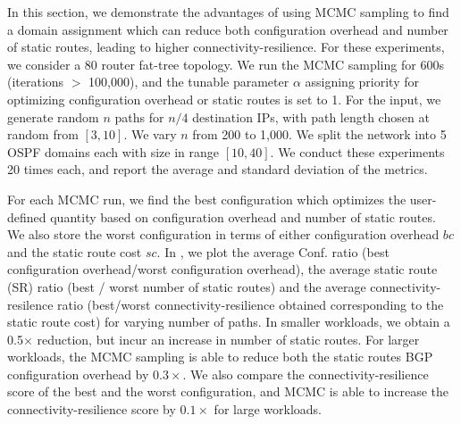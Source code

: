 In this section, we demonstrate the advantages of using MCMC sampling
to find a domain assignment which can  
reduce both configuration overhead and number of static routes, 
leading to higher connectivity-resilience. 
For these experiments,
we consider a
80 router fat-tree topology. 
We run the MCMC sampling for 600s
(iterations $>$ 100,000), 
and the tunable parameter $\alpha$ assigning
priority for optimizing configuration 
overhead or static routes is set
to 1. For the input, we generate 
random $n$ paths for $n/4$
destination IPs, with path
 length chosen at random from $[3,10]$. 
We vary $n$ from 200 to 1,000.
We
split the network into 5 OSPF domains 
each with size in range $[10,40]$. We
conduct these experiments 20 times each, 
and report the average and
standard deviation of the metrics.

%
For each MCMC run, we find the best configuration
which optimizes the user-defined quantity based on 
configuration overhead and number of static routes. 
We also store the worst configuration in terms of either
configuration overhead $bc$ and the static route cost 
$sc$. In , we plot the average Conf. ratio 
(best configuration overhead/worst configuration overhead), 
the average static route (SR) ratio 
(best / worst number of static routes) and the average 
connectivity-resilence ratio (best/worst connectivity-resilience obtained corresponding to the 
static route cost)
for varying number of paths. 
In smaller workloads, we obtain a 0.5$\times$ reduction, 
but incur an increase in number of static routes. For 
larger workloads, the MCMC sampling is able to
reduce both the static routes 
BGP configuration overhead by $0.3\times$. We also
compare the connectivity-resilience score 
of the best and the worst configuration, and MCMC
is able to increase the connectivity-resilience score 
by $0.1\times$ for large workloads.




